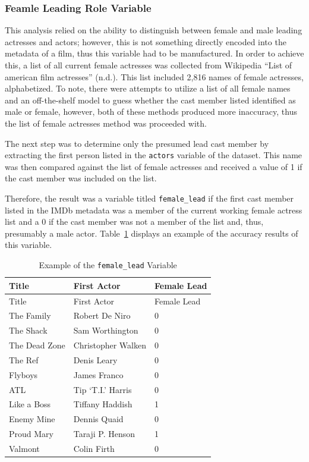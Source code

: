 \documentclass[
]{agujournal2019}
\begin{document}
\subsubsection{Feamle Leading Role
Variable}\label{feamle-leading-role-variable}

This analysis relied on the ability to distinguish between female and
male leading actresses and actors; however, this is not something
directly encoded into the metadata of a film, thus this variable had to
be manufactured. In order to achieve this, a list of all current female
actresses was collected from Wikipedia {``List of american film
actresses''} (n.d.). This list included 2,816 names of female actresses,
alphabetized. To note, there were attempts to utilize a list of all
female names and an off-the-shelf model to guess whether the cast member
listed identified as male or female, however, both of these methods
produced more inaccuracy, thus the list of female actresses method was
proceeded with.

The next step was to determine only the presumed lead cast member by
extracting the first person listed in the \texttt{actors} variable of
the dataset. This name was then compared against the list of female
actresses and received a value of 1 if the cast member was included on
the list.

Therefore, the result was a variable titled \texttt{female\_lead} if the
first cast member listed in the IMDb metadata was a member of the
current working female actress list and a 0 if the cast member was not a
member of the list and, thus, presumably a male actor. Table~\ref{tbl-7}
displays an example of the accuracy results of this variable.

\begin{longtable}[]{@{}lll@{}}
\caption{Example of the \texttt{female\_lead}
Variable}\label{tbl-7}\tabularnewline
\toprule\noalign{}
Title & First Actor & Female Lead \\
\midrule\noalign{}
\endfirsthead
\toprule\noalign{}
Title & First Actor & Female Lead \\
\midrule\noalign{}
\endhead
\bottomrule\noalign{}
\endlastfoot
The Family & Robert De Niro & 0 \\
The Shack & Sam Worthington & 0 \\
The Dead Zone & Christopher Walken & 0 \\
The Ref & Denis Leary & 0 \\
Flyboys & James Franco & 0 \\
ATL & Tip `T.I.' Harris & 0 \\
Like a Boss & Tiffany Haddish & 1 \\
Enemy Mine & Dennis Quaid & 0 \\
Proud Mary & Taraji P. Henson & 1 \\
Valmont & Colin Firth & 0 \\
\end{longtable}
\end{document}
